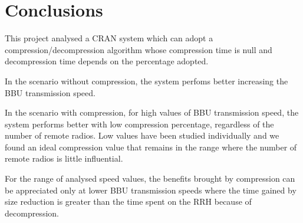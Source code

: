 \documentclass[11pt,a4paper,oneside, openright]{article}
\begin{document}
\section{Conclusions}
This project analysed a CRAN system which can adopt a compression/decompression algorithm whose compression time is null and decompression time depends on the percentage adopted.

In the scenario without compression, the system perfoms better increasing the BBU transmission speed.

In the scenario with compression, for high values of BBU transmission speed, the system performs better with low compression percentage, regardless of the number of remote radios. Low values have been studied individually and we found an ideal compression value that remains in the range where the number of remote radios is little influential.

For the range of analysed speed values, the benefits brought by compression can be appreciated only at lower BBU transmission speeds where the time gained by size reduction is greater than the time spent on the RRH because of decompression.
\end{document}
